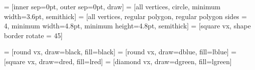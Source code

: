 
\newcommand{\nohang}[1]{\raisebox{0ex}[\height][0ex]{$#1$}}
\newcommand\likex[1]{\raisebox{0ex}[1ex][0ex]{$#1$}}
\newlength\fheight\settoheight{}
\newlength\pbarheight\settoheight\pbarheight{$\pp$}
\newcommand\likef[1]{\raisebox{0ex}[\the\fheight][0ex]{$#1$}}
\newcommand\likepbar[1]{\raisebox{0ex}[\the\pbarheight][0ex]{$#1$}}








\newcommand\roundvxwidth{3.6pt}

 = [inner sep=0pt, outer sep=0pt, draw]
     = [all vertices, circle, minimum width=\roundvxwidth, semithick]
\newcommand\squarewidth{4.8pt}
    = [all vertices, regular polygon, regular polygon sides = 4, minimum width=\squarewidth, minimum height=\squarewidth, semithick]
   = [square vx, shape border rotate = 45]

     = [round vx, draw=black, fill=black]
      = [round vx, draw=dblue, fill=lblue]
       = [square vx, draw=dred, fill=lred]
     = [diamond vx, draw=dgreen, fill=lgreen]

\newcommand\vertextoitslabelgap{1.4pt}
\newcommand\labelvertexgap{5pt}
\newcommand\vertexlabelgap{\labelvertexgap}
\newcommand\labellabelgap{5pt}%
\newcommand\pairvxgap{1.8ex}


\newcommand\vx[2]{%
\node[black vx] ({#2}) at ({#1}) {};}

\newcommand\bluevx[2]{%
\node[blue vx] ({#2}) at ({#1}) {};}

\newcommand\redvx[2]{%
\node[red vx] ({#2}) at ({#1}) {};}

